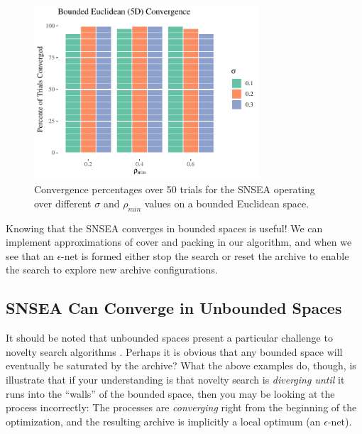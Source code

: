 \documentclass[twoside]{article}
\begin{document}
%
\begin{figure}[t]
  \center\includegraphics[width=0.75\textwidth]{Figures/bounded-conv-NOPOP.pdf}
  \caption{\label{fig:bounded:nopop:conv} Convergence percentages over 50 trials for the SNSEA operating over different $\sigma$ and $\rho_{min}$ values on a bounded Euclidean space.}
\end{figure}
%

Knowing that the SNSEA converges in bounded spaces is useful! We can implement approximations of cover and packing in our algorithm, and when we see that an $\epsilon$-net is formed either stop the search or reset the archive to enable the search to explore new archive configurations.  


\subsection{SNSEA Can Converge in Unbounded Spaces}
\label{subsec:unbounded}

It should be noted that unbounded spaces present a particular challenge to novelty search algorithms \citep{LehmanStanley2008ssls,Doncieux2019gecco}.  Perhaps it is obvious that any bounded space will eventually be saturated by the archive?  What the above examples do, though, is illustrate that if your understanding is that novelty search is \emph{diverging until} it runs into the ``walls'' of the bounded space, then you may be looking at the process incorrectly:  The processes are \emph{converging} right from the beginning of the optimization, and the resulting archive is implicitly a local optimum (an $\epsilon$-net).
\end{document}
